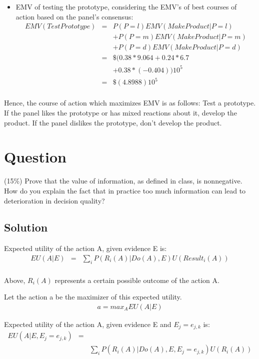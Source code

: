 \documentclass[10pt]{article}
\begin{document}
\begin{itemize}
 \item EMV of testing the prototype, considering the EMV's of best courses of action based on the panel's consensus:
\begin{eqnarray}
EMV(TestPrototype) & = & P(P=l)EMV(MakeProduct|P=l)\\
&&+P(P=m)EMV(MakeProduct|P=m)\\
&&+P(P=d)EMV(MakeProduct|P=d)\\
& = &\$(0.38*9.064+0.24*6.7\\
&&+0.38*(-0.404))10^{5}\\
& = &\$(4.8988)10^{5}\\
\end{eqnarray}

\end{itemize}

Hence, the course of action which maximizes EMV is as follows: Test a prototype. If the panel likes the prototype or has mixed reactions about it, develop the product. If the panel dislikes the prototype, don't develop the product.

\section{Question}
 (15\%) Prove that the value of information, as defined in class, is nonnegative. How do you explain the fact that in practice too much information can lead to deterioration in decision quality?

\subsection{Solution}

Expected utility of the action A, given evidence E is:
\begin{eqnarray}
EU(A|E) & = & \sum_{i} P(R_{i}(A)|Do(A),E)U(Result_{i}(A))\\
\end{eqnarray}

Above, $R_{i}(A)$ represents a certain possible outcome of the action A.

Let the action a be the maximizer of this expected utility.
\begin{eqnarray}
a = max_{A} EU(A|E) 
\end{eqnarray}


Expected utility of the action A, given evidence E and $E_{j}=e_{j,k}$ is:
\begin{eqnarray}
EU(A|E,E_{j}=e_{j,k}) & = & \\
& & \sum_{i} P(R_{i}(A)|Do(A),E,E_{j}=e_{j,k})U(R_{i}(A))\\
\end{eqnarray}
\end{document}
